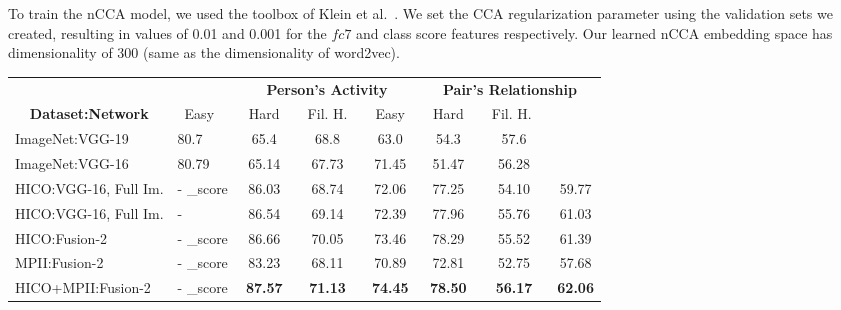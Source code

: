 \documentclass[runningheads]{llncs}
\begin{document}
To train the nCCA model, we used the toolbox of Klein et al.~\cite{klein2015associating}. We set the CCA regularization parameter using the validation sets we created, resulting in values of 0.01 and 0.001 for the $fc7$ and class score features respectively. Our learned nCCA embedding space has dimensionality of 300 (same as the dimensionality of word2vec).

	\begin{center}
		\begin{tabular}{ll|ccc|ccc}
            \hline
			\multicolumn{2}{c|}{} & \multicolumn{3}{|c|}{\bf Person's Activity} & \multicolumn{3}{c}{\bf Pair's Relationship}\\ %
			\multicolumn{1}{c}{\bf Dataset:Network} \&- \{\bf Feature} & {\ Easy\ } & {\ Hard\ } & {\ Fil. H.\ } & {\ Easy\ } & {\ Hard\ } & {\ Fil. H. \ }\\ \hline
			\multicolumn{1}{l}{ImageNet:VGG-19~\cite{yu2015visual}} \&- \fc7  & 80.7 & 65.4 & 68.8 & 63.0 & 54.3 & 57.6 \\ 
			\multicolumn{1}{l}{ImageNet:VGG-16} \&- \fc7  			& 80.79 & 65.14 & 67.73 & 71.45 & 51.47 & 56.28 \\ \hline
			\multicolumn{1}{l}{HICO:VGG-16, Full Im.}\	 &- \cls\_score 		& 86.03 & 68.74 & 72.06 & 77.25 & 54.10 & 59.77 \\ %
			\multicolumn{1}{l}{HICO:VGG-16, Full Im.}\	 &- \fc7 				& 86.54 & 69.14 & 72.39 & 77.96 & 55.76 & 61.03\\ \hline
			\multicolumn{1}{l}{HICO:Fusion-2}\  &- \cls\_score 	& 86.66 & 70.05 & 73.46 & 78.29 & 55.52 & 61.39 \\ %
			\multicolumn{1}{l}{MPII:Fusion-2}\  &- \cls\_score 	& 83.23	& 68.11	& 70.89 & 72.81 & 52.75 & 57.68 \\ \hline
			\multicolumn{1}{l}{HICO+MPII:Fusion-2}\  &- \cls\_score 	& {\bf 87.57} & {\bf 71.13} & {\bf 74.45} & {\bf 78.50} & {\bf 56.17} & {\bf 62.06}

        \end{tabular}
	\end{center}
\end{document}

